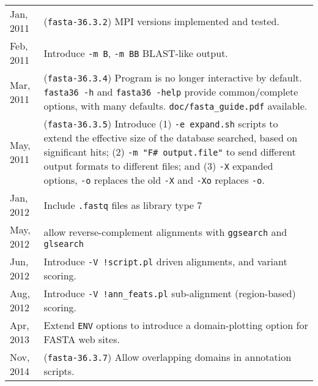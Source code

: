 \begin{longtable}{p{0.75 in}p{5.25 in}}
Jan, 2011 & (\texttt{fasta-36.3.2}) MPI versions implemented and tested.\\[1ex]

Feb, 2011 & Introduce \texttt{-m B}, \texttt{-m BB} BLAST-like output.\\[1.0ex]

Mar, 2011 & (\texttt{fasta-36.3.4}) Program is no longer interactive by
default. \texttt{fasta36 -h} and \texttt{fasta36 -help} provide
common/complete options, with many defaults. \texttt{doc/fasta\_guide.pdf} available.\\[1.0ex]

May, 2011 & (\texttt{fasta-36.3.5}) Introduce (1) \texttt{-e
  expand.sh} scripts to extend the effective size of the database
searched, based on significant hits; (2) \texttt{-m "F\# output.file"}
to send different output formats to different files; and (3)
\texttt{-X} expanded options, \texttt{-o} replaces the old \texttt{-X}
and \texttt{-Xo} replaces \texttt{-o}. \\[1.0ex]

Jan, 2012 & Include \texttt{.fastq} files as library type 7 \\[1.0ex]

May, 2012 & allow reverse-complement alignments with \texttt{ggsearch} and \texttt{glsearch} \\[1.0ex]

Jun, 2012 & Introduce \texttt{-V !script.pl} driven alignments, and variant scoring.\\[1.0ex]

Aug, 2012 & Introduce \texttt{-V !ann\_feats.pl} sub-alignment (region-based) scoring.\\[1.0ex]

Apr, 2013 & Extend \texttt{ENV} options to introduce a domain-plotting option for FASTA web sites.\\[1.0ex]

Nov, 2014 & (\texttt{fasta-36.3.7}) Allow overlapping domains in annotation scripts.\\[1.0ex]

\hline
\end{longtable}
